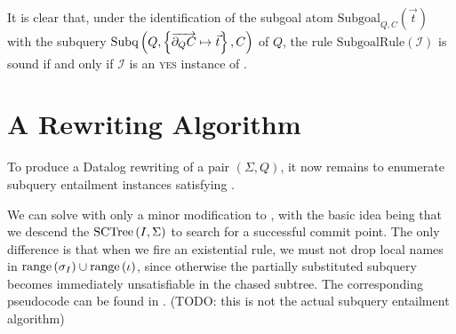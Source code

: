 \documentclass[12pt]{report}
\theoremstyle{plain}
\theoremstyle{definition}
\newcommand{\range}[1]{\ensuremath{\normalfont{\operatorname{range}} \left( #1 \right)}}
\newcommand{\SCTree}[2]{\ensuremath{\normalfont{\textrm{SCTree}} \left( #1, #2 \right)}}
\newcommand{\Subq}[3]{\ensuremath{\normalfont{\textrm{Subq}} \left( #1, #2, #3 \right)}}
\begin{document}
It is clear that, under the identification of the subgoal atom $\mathrm{Subgoal}_{Q,C}(\vec{t})$ with the subquery $\Subq{Q}{\left\{ \overrightarrow{\partial_Q C} \mapsto \vec{t} \right\}}{C}$ of $Q$, the rule $\mathrm{SubgoalRule}(\mathcal{I})$ is sound if and only if $\mathcal{I}$ is an \textsc{yes} instance of .

\section{A Rewriting Algorithm}
\label{a-rewriting-algorithm}

To produce a Datalog rewriting of a pair $(\Sigma, Q)$, it now remains to enumerate subquery entailment instances satisfying .

We can solve  with only a minor modification to , with the basic idea being that we descend the $\SCTree{I}{\Sigma}$ to search for a successful commit point. The only difference is that when we fire an existential rule, we must not drop local names in $\range{\sigma_I} \cup \range{\iota}$, since otherwise the partially substituted subquery becomes immediately unsatisfiable in the chased subtree. The corresponding pseudocode can be found in . (TODO: this is not the actual subquery entailment algorithm)
\end{document}
